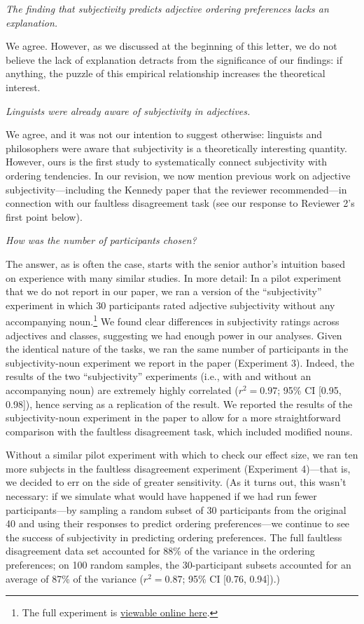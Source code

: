\documentclass[12pt]{article}
\begin{document}
\item \emph{The finding that subjectivity predicts adjective ordering preferences lacks an explanation.}

We agree. However, as we discussed at the beginning of this letter, we do not believe the lack of explanation detracts from the significance of our findings: if anything, the puzzle of this empirical relationship increases the theoretical interest.


\item \emph{Linguists were already aware of subjectivity in adjectives.}

We agree, and it was not our intention to suggest otherwise: linguists and philosophers were aware that subjectivity is a theoretically interesting quantity. However, ours is the first study to systematically connect subjectivity with ordering tendencies. In our revision, we now mention previous work on adjective subjectivity---including the Kennedy paper that the reviewer recommended---in connection with our faultless disagreement task (see our response to Reviewer 2's first point below).

\item \emph{How was the number of participants chosen?}

The answer, as is often the case, starts with the senior author's intuition based on experience with many similar studies. In more detail: In a pilot experiment that we do not report in our paper, we ran a version of the ``subjectivity'' experiment in which 30 participants rated adjective subjectivity without any accompanying noun.\footnote{The full experiment is \href{http://web.stanford.edu/~scontras/adjective_ordering/experiments/6-subjectivity/subjectivity.html}{viewable online here}.} We found clear differences in subjectivity ratings across adjectives and classes, suggesting we had enough power in our analyses. 
Given the identical nature of the tasks, we ran the same number of participants in the subjectivity-noun experiment we report in the paper (Experiment 3). Indeed, the results of the two ``subjectivity'' experiments (i.e., with and without an accompanying noun) are extremely highly correlated ($r^2=0.97$; 95\% CI [0.95,  0.98]), hence serving as a replication of the result. We reported the results of the subjectivity-noun experiment in the paper to allow for a more straightforward comparison with the faultless disagreement task, which included modified nouns.

Without a similar pilot experiment with which to check our effect size, we ran ten more subjects in the faultless disagreement experiment (Experiment 4)---that is, we decided to err on the side of greater sensitivity. (As it turns out, this wasn't necessary: if we simulate what would have happened if we had run fewer participants---by sampling a random subset of 30 participants from the original 40 and using their responses to predict ordering preferences---we continue to see the success of subjectivity in predicting ordering preferences. The full faultless disagreement data set accounted for 88\% of the variance in the ordering preferences; on 100 random samples, the 30-participant subsets accounted for an average of 87\% of the variance ($r^2=0.87$; 95\% CI [0.76, 0.94]).)
\end{document}
